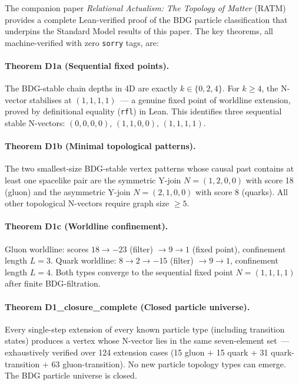 \documentclass[11pt,a4paper]{article}
\begin{document}
The companion paper \emph{Relational Actualism: The Topology of Matter}
(RATM)~\citep{Sandeman2026RATM} provides a complete Lean-verified proof
of the BDG particle classification that underpins the Standard Model
results of this paper.
The key theorems, all machine-verified with zero \texttt{sorry} tags, are:

\paragraph{Theorem D1a (Sequential fixed points).}
The BDG-stable chain depths in 4D are exactly $k \in \{0,2,4\}$.
For $k \geq 4$, the N-vector stabilises at $(1,1,1,1)$~--- a genuine
fixed point of worldline extension, proved by definitional equality
(\texttt{rfl}) in Lean. This identifies three sequential stable
N-vectors: $(0,0,0,0)$, $(1,1,0,0)$, $(1,1,1,1)$.

\paragraph{Theorem D1b (Minimal topological patterns).}
The two smallest-size BDG-stable vertex patterns whose causal past contains
at least one spacelike pair are the symmetric Y-join $N=(1,2,0,0)$
with score 18 (gluon) and the asymmetric Y-join $N=(2,1,0,0)$ with
score 8 (quarks). All other topological N-vectors require graph size $\geq 5$.

\paragraph{Theorem D1c (Worldline confinement).}
Gluon worldline: scores $18 \to -23$ (filter) $\to 9 \to 1$ (fixed point),
confinement length $L=3$. Quark worldline: $8 \to 2 \to -15$ (filter)
$\to 9 \to 1$, confinement length $L=4$. Both types converge to the
sequential fixed point $N=(1,1,1,1)$ after finite BDG-filtration.

\paragraph{Theorem D1\_closure\_complete (Closed particle universe).}
Every single-step extension of every known particle type (including transition
states) produces a vertex whose N-vector lies in the same seven-element
set~--- exhaustively verified over 124 extension cases (15 gluon + 15 quark
+ 31 quark-transition + 63 gluon-transition). No new particle topology types
can emerge. The BDG particle universe is closed.
\end{document}
